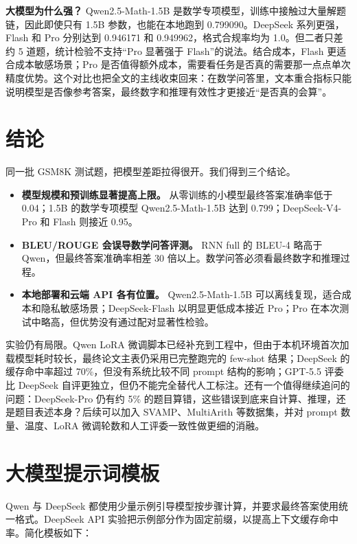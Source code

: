 \documentclass[UTF8,a4paper,zihao=-4]{ctexart}
\begin{document}
\textbf{大模型为什么强？}
Qwen2.5-Math-1.5B 是数学专项模型，训练中接触过大量解题链，因此即使只有 1.5B 参数，也能在本地跑到 0.799090。DeepSeek 系列更强，Flash 和 Pro 分别达到 0.946171 和 0.949962，格式合规率均为 1.0。但二者只差约 5 道题，统计检验不支持“Pro 显著强于 Flash”的说法。结合成本，Flash 更适合成本敏感场景；Pro 是否值得额外成本，需要看任务是否真的需要那一点点单次精度优势。这个对比也把全文的主线收束回来：在数学问答里，文本重合指标只能说明模型是否像参考答案，最终数字和推理有效性才更接近“是否真的会算”。

\section{结论}

同一批 GSM8K 测试题，把模型差距拉得很开。我们得到三个结论。

\begin{itemize}
  \item \textbf{模型规模和预训练显著提高上限。} 从零训练的小模型最终答案准确率低于 0.04；1.5B 的数学专项模型 Qwen2.5-Math-1.5B 达到 0.799；DeepSeek-V4-Pro 和 Flash 则接近 0.95。
  \item \textbf{BLEU/ROUGE 会误导数学问答评测。} RNN full 的 BLEU-4 略高于 Qwen，但最终答案准确率相差 30 倍以上。数学问答必须看最终数字和推理过程。
  \item \textbf{本地部署和云端 API 各有位置。} Qwen2.5-Math-1.5B 可以离线复现，适合成本和隐私敏感场景；DeepSeek-Flash 以明显更低成本接近 Pro；Pro 在本次测试中略高，但优势没有通过配对显著性检验。
\end{itemize}

实验仍有局限。Qwen LoRA 微调脚本已经补充到工程中，但由于本机环境首次加载模型耗时较长，最终论文主表仍采用已完整跑完的 few-shot 结果；DeepSeek 的缓存命中率超过 70\%，但没有系统比较不同 prompt 结构的影响；GPT-5.5 评委比 DeepSeek 自评更独立，但仍不能完全替代人工标注。还有一个值得继续追问的问题：DeepSeek-Pro 仍有约 5\% 的题目算错，这些错误到底来自计算、推理，还是题目表述本身？后续可以加入 SVAMP、MultiArith 等数据集，并对 prompt 数量、温度、LoRA 微调轮数和人工评委一致性做更细的消融。

\appendix
\section{大模型提示词模板}

Qwen 与 DeepSeek 都使用少量示例引导模型按步骤计算，并要求最终答案使用统一格式。DeepSeek API 实验把示例部分作为固定前缀，以提高上下文缓存命中率。简化模板如下：
\end{document}
